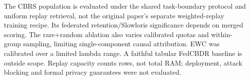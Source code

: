 \documentclass[10pt]{article}
\begin{document}
The CBRS population is evaluated under the shared task-boundary protocol and uniform replay retrieval, not the original paper's separate weighted-replay training recipe. Its federated retention/Slowloris significance depends on merged scoring. The rare+random ablation also varies calibrated quotas and within-group sampling, limiting single-component causal attribution. EWC was calibrated over a limited lambda range. A faithful tabular FedCBDR baseline is outside scope. Replay capacity counts rows, not total RAM; deployment, attack blocking and formal privacy guarantees were not evaluated.
\end{document}
